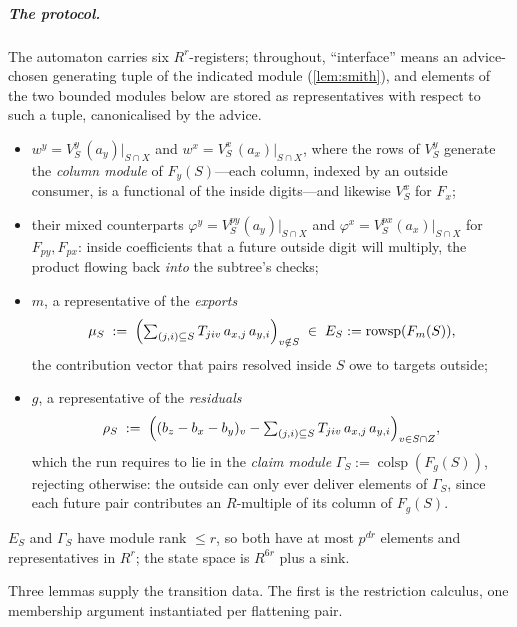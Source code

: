 \documentclass[a4paper,UKenglish,autoref,anonymous]{lipics-v2021}
\newcommand{\R}{R}                                   %
\newcommand{\rs}{\operatorname{rowsp}}
\newcommand{\cs}{\operatorname{colsp}}
\begin{document}
\subparagraph*{The protocol.}
The automaton carries six $\R^r$-registers; throughout, ``interface''
means an advice-chosen generating tuple of the indicated module
(\autoref{lem:smith}), and elements of the two bounded modules below are
stored as representatives with respect to such a tuple, canonicalised by
the advice.
\begin{itemize}
\item $w^y = V^y_S\, (a_y)|_{S \cap X}$ and $w^x = V^x_S\, (a_x)|_{S
  \cap X}$, where the rows of $V^y_S$ generate the \emph{column module}
  of $F_y(S)$---each column, indexed by an outside consumer, is a
  functional of the inside digits---and likewise $V^x_S$ for $F_x$;
\item their mixed counterparts $\varphi^y = V^{py}_S (a_y)|_{S \cap X}$
  and $\varphi^x = V^{px}_S (a_x)|_{S \cap X}$ for $F_{py}, F_{px}$:
  inside coefficients that a future outside digit will multiply, the
  product flowing back \emph{into} the subtree's checks;
\item $m$, a representative of the \emph{exports}
  \[
    \mu_S \;:=\; \Bigl( \textstyle\sum_{(j,i) \subseteq S} T_{jiv}\,
    a_{x,j}\, a_{y,i} \Bigr)_{v \notin S} \;\in\; E_S := \rs(F_m(S)),
  \]
  the contribution vector that pairs resolved inside $S$ owe to targets
  outside;
\item $g$, a representative of the \emph{residuals}
  \[
    \rho_S \;:=\; \Bigl( (b_z - b_x - b_y)_v - \textstyle\sum_{(j,i)
    \subseteq S} T_{jiv}\, a_{x,j}\, a_{y,i} \Bigr)_{v \in S \cap Z},
  \]
  which the run requires to lie in the \emph{claim module} $\Gamma_S :=
  \cs(F_g(S))$, rejecting otherwise: the outside can only ever deliver
  elements of $\Gamma_S$, since each future pair contributes an
  $\R$-multiple of its column of $F_g(S)$.
\end{itemize}
$E_S$ and $\Gamma_S$ have module rank $\le r$, so both have at most
$p^{dr}$ elements and representatives in $\R^r$; the state space is
$\R^{6r}$ plus a sink.

Three lemmas supply the transition data. The first is the restriction
calculus, one membership argument instantiated per flattening pair.
\end{document}
